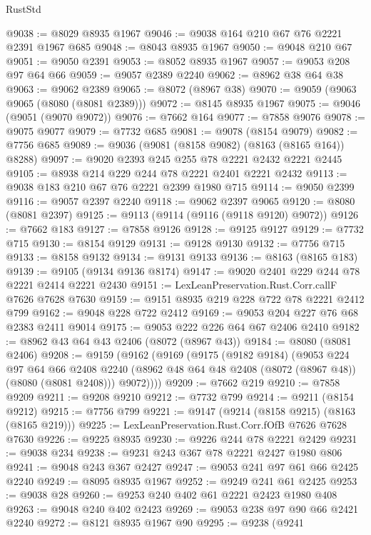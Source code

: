 \begin{lexlean}{RustStd}
\begin{coremodule}
{\begin{coremodule}
{{{{{{{{{{{{{{{{{{{{{{{{{{{{{{{{{{{{{{{{{{{{{{{{{{{{{@9038 := @8029 @8935 @1967
@9046 := @9038 @164 @210 @67 @76 @2221 @2391 @1967 @685
@9048 := @8043 @8935 @1967
@9050 := @9048 @210 @67
@9051 := @9050 @2391
@9053 := @8052 @8935 @1967
@9057 := @9053 @208 @97 @64 @66
@9059 := @9057 @2389 @2240
@9062 := @8962 @38 @64 @38
@9063 := @9062 @2389
@9065 := @8072 (@8967 @38)
@9070 := @9059 (@9063 @9065 (@8080 (@8081 @2389)))
@9072 := @8145 @8935 @1967
@9075 := @9046 (@9051 (@9070 @9072))
@9076 := @7662 @164
@9077 := @7858 @9076
@9078 := @9075 @9077
@9079 := @7732 @685
@9081 := @9078 (@8154 @9079)
@9082 := @7756 @685
@9089 := @9036 (@9081 (@8158 @9082) (@8163 (@8165 @164)) @8288)
@9097 := @9020 @2393 @245 @255 @78 @2221 @2432 @2221 @2445
@9105 := @8938 @214 @229 @244 @78 @2221 @2401 @2221 @2432
@9113 := @9038 @183 @210 @67 @76 @2221 @2399 @1980 @715
@9114 := @9050 @2399
@9116 := @9057 @2397 @2240
@9118 := @9062 @2397 @9065
@9120 := @8080 (@8081 @2397)
@9125 := @9113 (@9114 (@9116 (@9118 @9120) @9072))
@9126 := @7662 @183
@9127 := @7858 @9126
@9128 := @9125 @9127
@9129 := @7732 @715
@9130 := @8154 @9129
@9131 := @9128 @9130
@9132 := @7756 @715
@9133 := @8158 @9132
@9134 := @9131 @9133
@9136 := @8163 (@8165 @183)
@9139 := @9105 (@9134 @9136 @8174)
@9147 := @9020 @2401 @229 @244 @78 @2221 @2414 @2221 @2430
@9151 := LexLeanPreservation.Rust.Corr.callF @7626 @7628 @7630
@9159 := @9151 @8935 @219 @228 @722 @78 @2221 @2412 @799
@9162 := @9048 @228 @722 @2412
@9169 := @9053 @204 @227 @76 @68 @2383 @2411 @9014
@9175 := @9053 @222 @226 @64 @67 @2406 @2410
@9182 := @8962 @43 @64 @43 @2406 (@8072 (@8967 @43))
@9184 := @8080 (@8081 @2406)
@9208 := @9159
    (@9162
      (@9169
        (@9175
          (@9182 @9184)
          (@9053
            @224
            @97
            @64
            @66
            @2408
            @2240
            (@8962 @48 @64 @48 @2408 (@8072 (@8967 @48)) (@8080 (@8081 @2408)))
            @9072))))
@9209 := @7662 @219
@9210 := @7858 @9209
@9211 := @9208 @9210
@9212 := @7732 @799
@9214 := @9211 (@8154 @9212)
@9215 := @7756 @799
@9221 := @9147 (@9214 (@8158 @9215) (@8163 (@8165 @219)))
@9225 := LexLeanPreservation.Rust.Corr.fOfB @7626 @7628 @7630
@9226 := @9225 @8935
@9230 := @9226 @244 @78 @2221 @2429
@9231 := @9038 @234
@9238 := @9231 @243 @367 @78 @2221 @2427 @1980 @806
@9241 := @9048 @243 @367 @2427
@9247 := @9053 @241 @97 @61 @66 @2425 @2240
@9249 := @8095 @8935 @1967
@9252 := @9249 @241 @61 @2425
@9253 := @9038 @28
@9260 := @9253 @240 @402 @61 @2221 @2423 @1980 @408
@9263 := @9048 @240 @402 @2423
@9269 := @9053 @238 @97 @90 @66 @2421 @2240
@9272 := @8121 @8935 @1967 @90
@9295 := @9238
    (@9241
}}}}}}}}}}}}}}}}}}}}}}}}}}}}}}}}}}}}}}}}}}}}}}}}}}}}}
\end{coremodule}}
\end{coremodule}
\end{lexlean}
